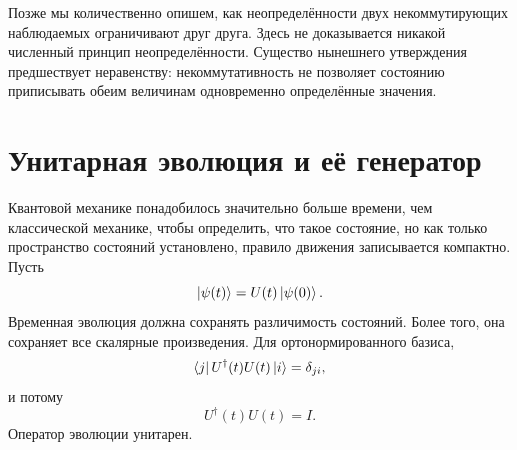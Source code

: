 Позже мы количественно опишем, как неопределённости двух некоммутирующих наблюдаемых ограничивают друг друга. Здесь не доказывается никакой численный принцип неопределённости. Существо нынешнего утверждения предшествует неравенству: некоммутативность не позволяет состоянию приписывать обеим величинам одновременно определённые значения.

\begin{classroomqa}
\end{classroomqa}

\begin{classroomqa}
\end{classroomqa}

\section{Унитарная эволюция и её генератор}

Квантовой механике понадобилось значительно больше времени, чем классической механике, чтобы определить, что такое состояние, но как только пространство состояний установлено, правило движения записывается компактно. Пусть
\begin{equation}
\left\lvert\psi(t)\right\rangle=U(t)\left\lvert\psi(0)\right\rangle.
\label{eq:l5-propagator}
\end{equation}
Временная эволюция должна сохранять различимость состояний. Более того, она сохраняет все скалярные произведения. Для ортонормированного базиса,
\begin{equation}
\left\langle j\right\rvert U^\dagger(t)U(t)\left\lvert i\right\rangle=\delta_{ji},
\end{equation}
и потому
\begin{equation}
U^\dagger(t)U(t)=I.
\label{eq:l5-unitarity}
\end{equation}
Оператор эволюции унитарен.

